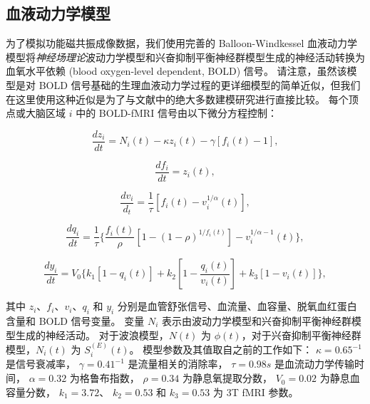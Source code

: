 \documentclass[lang=cn,a4paper,newtx,citestyle=gb7714-2015, bibstyle=gb7714-2015]{elegantpaper}
\begin{document}
\subsection{血液动力学模型} \label{sec:haemodynamic_model}

为了模拟功能磁共振成像数据，我们使用完善的 Balloon-Windkessel 血液动力学模型将\textit{神经场理论}波动力学模型和兴奋抑制平衡神经群模型生成的神经活动转换为血氧水平依赖 (blood oxygen-level dependent, BOLD) 信号\cite{stephan2007comparing}。
请注意，虽然该模型是对 BOLD 信号\cite{aquino2012hemodynamic,pang2017effects,pang2018biophysically}基础的生理血液动力学过程的更详细模型的简单近似，但我们在这里使用这种近似是为了与文献中的绝大多数建模研究进行直接比较\cite{deco2021dynamical,demirtacs2019hierarchical,aquino2022intersection,deco2009key,cabral2014exploring}。
每个顶点或大脑区域 $ i $ 中的 BOLD-fMRI 信号由以下微分方程控制：

\begin{equation}\label{eq:vasodilatory_signal}
	\frac{dz_i}{dt} = N_i (t) - 
					  \kappa z_i(t) - 
					  \gamma [f_i(t) - 1], 
\end{equation}


\begin{equation}\label{eq:blood_inflow}
	\frac{df_i}{dt} = z_i(t),
\end{equation}


\begin{equation}\label{eq:blood_volume}
	\frac{dv_i}{d_t} = \frac{1}{\tau} [f_i(t) - v_i^{1/\alpha} (t)],
\end{equation}


\begin{equation}\label{eq:deoxyhaemoglobin}
	\frac{dq_i}{dt} = \frac{1}{\tau}
					\{
					\frac{f_i(t)}{\rho}
					[1 - (1-\rho)^{1/f_i(t)}]
						- v_i^{1/\alpha - 1} (t)
					\},
\end{equation}


\begin{equation}\label{eq:BOLD_signal}
	\frac{dy_i}{dt} = V_0
					\{
						k_1 [1 - q_i(t)] +
						k_2 [1 - \frac{q_i(t)}{v_i(t)}] + 
						k_3 [1 - v_i(t)]
					\},
\end{equation}


其中 $ z_i $、$ f_i $、$ v_i $、$ q_i $ 和 $ y_i $ 分别是血管舒张信号、血流量、血容量、脱氧血红蛋白含量和 BOLD 信号变量。
变量 $ N_i $ 表示由波动力学模型和兴奋抑制平衡神经群模型生成的神经活动。
对于波浪模型，$ N(t) $ 为 $ \phi (t) $，对于兴奋抑制平衡神经群模型，$ N_i (t) $ 为 $ S_i^{(E)} (t) $。
模型参数及其值取自之前的工作\cite{stephan2007comparing,heinzle2016hemodynamic}如下：
$ \kappa = 0.65^{-1} $ 是信号衰减率，
$ \gamma = 0.41^{-1} $ 是流量相关的消除率，
$ \tau = 0.98 s $ 是血流动力学传输时间，
$ \alpha = 0.32 $ 为格鲁布指数，
$ \rho = 0.34 $ 为静息氧提取分数，
$ V_0 = 0.02 $ 为静息血容量分数，
$ k_1 = 3.72 $、
$ k_2 = 0.53 $ 
和 $ k_3 = 0.53 $ 为 3T fMRI 参数。
\end{document}
